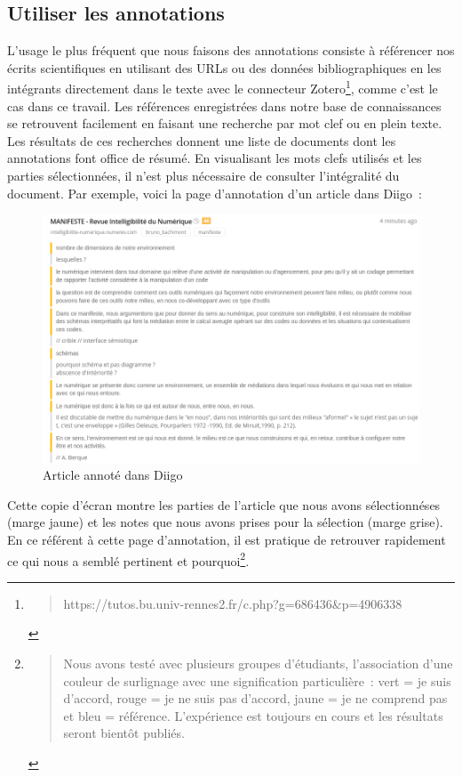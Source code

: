 \documentclass[
  letterpaper,
  DIV=11,
  numbers=noendperiod]{scrreprt}
\begin{document}
\hypertarget{sec-utiliserAnnotations}{%
\subsection{Utiliser les annotations}\label{sec-utiliserAnnotations}}

L'usage le plus fréquent que nous faisons des annotations consiste à
référencer nos écrits scientifiques en utilisant des URLs ou des données
bibliographiques en les intégrants directement dans le texte avec le
connecteur Zotero\footnote{\begin{quote}
  https://tutos.bu.univ-rennes2.fr/c.php?g=686436\&p=4906338
  \end{quote}}, comme c'est le cas dans ce travail. Les références
enregistrées dans notre base de connaissances se retrouvent facilement
en faisant une recherche par mot clef ou en plein texte. Les résultats
de ces recherches donnent une liste de documents dont les annotations
font office de résumé. En visualisant les mots clefs utilisés et les
parties sélectionnées, il n'est plus nécessaire de consulter
l'intégralité du document. Par exemple, voici la page d'annotation d'un
article dans Diigo~:

\begin{figure}

{\centering \includegraphics{media/10000001000003A4000002648983E64502CE7461.png}

}

\caption{\label{fig-annotationDiigo}Article annoté dans Diigo}

\end{figure}

Cette copie d'écran montre les parties de l'article que nous avons
sélectionnéses (marge jaune) et les notes que nous avons prises pour la
sélection (marge grise). En ce référent à cette page d'annotation, il
est pratique de retrouver rapidement ce qui nous a semblé pertinent et
pourquoi\footnote{\begin{quote}
  Nous avons testé avec plusieurs groupes d'étudiants, l'association
  d'une couleur de surlignage avec une signification particulière~: vert
  = je suis d'accord, rouge = je ne suis pas d'accord, jaune = je ne
  comprend pas et bleu = référence. L'expérience est toujours en cours
  et les résultats seront bientôt publiés.
  \end{quote}}.
\end{document}
